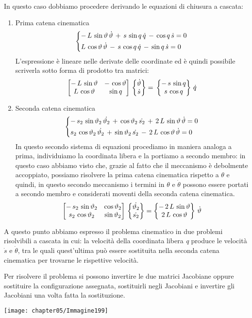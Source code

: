 In questo caso dobbiamo procedere derivando le equazioni di chiusura a cascata:
\begin{enumerate}
\item Prima catena cinematica
\[
\begin{dcases}
-\,L\,\sin{\theta}\,\dot{\theta}\,+\,s\,\sin{q}\,\dot{q}\,-\,\cos{q}\,\dot{s} = 0\\
L\,\cos{\theta}\,\dot{\theta}\,-\,s\,\cos{q}\,\dot{q}\,-\,\sin{q}\,\dot{s} = 0
\end{dcases}
\]
L'espressione è lineare nelle derivate delle coordinate ed è quindi possibile scriverla sotto forma di prodotto tra matrici:
\[\M{-\,L\,\sin{\theta}&-\,\cos{\theta}\\L\,\cos{\theta}&\,\sin{q}}\,\B{\dot{\theta}\\\dot{s}} = \,\B{-\,s\,\sin{q}\\s\,\cos{q}}\,\dot{q}\] 
\item Seconda catena cinematica
\[
\begin{dcases}
-\,s_2\,\sin{\theta_2}\,\dot{\theta_2}\,+\,\cos{\theta_2}\,\dot{s_2}\,+\,2\,L\,\sin{\theta}\,\dot{\theta} = 0\\
s_2\,\cos{\theta_2}\,\dot{\theta_2}\,+\,\sin{\theta_2}\,\dot{s_2}\,-\,2\,L\,\cos{\theta}\,\dot{\theta} = 0
\end{dcases}
\]
In questo secondo sistema di equazioni procediamo in maniera analoga a prima, individuiamo la coordinata libera e la portiamo a secondo membro: in questo caso abbiamo visto che, grazie al fatto che il meccanismo è debolmente accoppiato, possiamo risolvere la prima catena cinematica rispetto a $\theta$ e quindi, in questo secondo meccanismo i termini in $\theta$ e $\dot{\theta}$ possono essere portati a secondo membro e considerati moventi della seconda catena cinematica.
\[\M{-\,s_2\,\sin{\theta_2}&\cos{\theta_2}\\s_2\,\cos{\theta_2}&\sin{\theta_2}}\,\B{\dot{\theta_2}\\\dot{s_2}} = \B{-\,2\,L\,\sin{\theta}\\2\,L\,\cos{\theta}}\,\dot{\theta}\]
\end{enumerate}

\begin{minipage}{.5\textwidth}
A questo punto abbiamo espresso il problema cinematico in due problemi risolvibili a cascata in cui: la velocità della coordinata libera \emph{q} produce le velocità $\dot{s}$ e $\dot{\theta}$,  tra le quali quest'ultima può essere sostituita nella seconda catena cinematica per trovarne le rispettive velocità.

Per risolvere il problema si possono invertire le due matrici Jacobiane oppure sostituire la configurazione assegnata, sostituirli negli Jacobiani e invertire gli Jacobiani una volta fatta la sostituzione.
\end{minipage}
\hfill
\begin{minipage}{.5\textwidth}
\centering
\texttt{[image: chapter05/Immagine199]}
\end{minipage}

